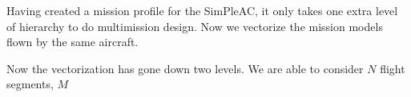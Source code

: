 Having created a mission profile for the SimPleAC, it only takes one extra level of
hierarchy to do multimission design. Now we vectorize the mission models flown by the same aircraft.

%
%

Now the vectorization has gone down two levels. We are able to consider $N$ flight segments, $M$



